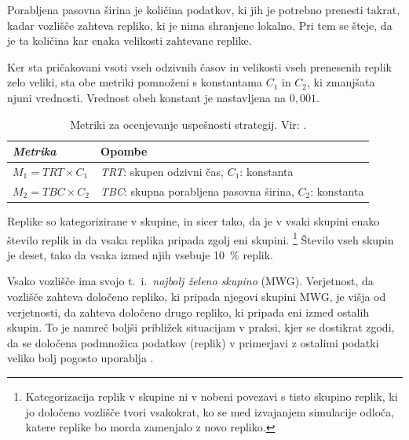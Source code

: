 \documentclass[a4paper, 12pt]{book}
\begin{document}
Porabljena pasovna širina je količina podatkov, ki jih je potrebno prenesti
takrat, kadar vozlišče zahteva repliko, ki je nima shranjene lokalno. Pri
tem se šteje, da je ta količina kar enaka velikosti zahtevane replike.

Ker sta pričakovani vsoti vseh odzivnih časov in velikosti vseh prenesenih
replik zelo veliki, sta obe metriki pomnoženi s konstantama $C_1$ in $C_2$,
ki zmanjšata njuni vrednosti. Vrednost obeh konstant je nastavljena na
$0,001$.

\begin{table}
\small
  \begin{center}
    \begin{tabulary}{1.0\textwidth}{ >{\itshape}p{9em} J}
      \textnormal{Metrika} & Opombe \\
      \hline
      $M_1 = \mathit{TRT} \times C_1$ &
        \textit{TRT}: skupen odzivni čas, $C_1$: konstanta \\
      $M_2 = \mathit{TBC} \times C_2$ &
        \textit{TBC}: skupna porabljena pasovna širina, $C_2$: konstanta
    \end{tabulary}
  \caption{Metriki za ocenjevanje uspešnosti strategij.
    Vir: \cite{efs2011,mfs2012}.}
  \end{center}

  \label{tbl:sim_metrics}
\end{table}

Replike so kategorizirane v skupine, in sicer tako, da je v vsaki skupini
enako število replik in da vsaka replika pripada zgolj eni skupini.%
\footnote{Kategorizacija replik v skupine ni v nobeni povezavi s tisto skupino
replik, ki jo določeno vozlišče tvori vsakokrat, ko se med izvajanjem
simulacije odloča, katere replike bo morda zamenjalo z novo repliko.}
Število vseh skupin je deset, tako da vsaka izmed njih vsebuje 10~\% replik.

Vsako vozlišče ima svojo t.~i.~\textit{najbolj želeno skupino} (MWG).
Verjetnost, da vozlišče zahteva določeno repliko, ki pripada njegovi skupini
MWG, je višja od verjetnosti, da zahteva določeno drugo repliko, ki pripada
eni izmed ostalih skupin. To je namreč boljši približek situacijam v praksi,
kjer se dostikrat zgodi, da se določena podmnožica podatkov (replik) v
primerjavi z ostalimi podatki veliko bolj pogosto uporablja
\cite{efs2011, mfs2012}.
\end{document}
